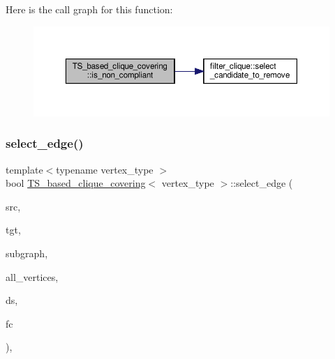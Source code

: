 Here is the call graph for this function\+:
\nopagebreak
\begin{figure}[H]
\begin{center}
\leavevmode
\includegraphics[width=350pt]{d1/d29/classTS__based__clique__covering_a5a3e99dae13279b217976fba856fb30d_cgraph}
\end{center}
\end{figure}
\mbox{\label{classTS__based__clique__covering_a5a637fe39f725d7486e89fb3f773476f}} 
\subsubsection{\texorpdfstring{select\+\_\+edge()}{select\_edge()}}
{\footnotesize\ttfamily template$<$typename vertex\+\_\+type $>$ \\
bool \hyperlink{classTS__based__clique__covering}{T\+S\+\_\+based\+\_\+clique\+\_\+covering}$<$ vertex\+\_\+type $>$\+::select\+\_\+edge (\begin{DoxyParamCaption}\item[{\hyperlink{clique__covering__graph_8hpp_a9cb45047ea8c5ed95a8cfa90494345aa}{C\+\_\+vertex} \&}]{src,  }\item[{\hyperlink{clique__covering__graph_8hpp_a9cb45047ea8c5ed95a8cfa90494345aa}{C\+\_\+vertex} \&}]{tgt,  }\item[{const \hyperlink{clique__covering__graph_8hpp_aa88e9419fe776ef37020cacd507cc4ad}{cc\+\_\+compatibility\+\_\+graph} \&}]{subgraph,  }\item[{const \hyperlink{classCustomUnorderedSet}{Custom\+Unordered\+Set}$<$ \hyperlink{clique__covering__graph_8hpp_a9cb45047ea8c5ed95a8cfa90494345aa}{C\+\_\+vertex} $>$ \&}]{all\+\_\+vertices,  }\item[{typename boost\+::disjoint\+\_\+sets$<$ \hyperlink{clique__covering__graph_8hpp_af170aff46b9e4328f1ad9b119cf78b4a}{rank\+\_\+pmap\+\_\+type}, \hyperlink{clique__covering__graph_8hpp_af4c454ac367cfb12e29c98e6bc942a06}{pred\+\_\+pmap\+\_\+type} $>$ \&}]{ds,  }\item[{const \hyperlink{structfilter__clique}{filter\+\_\+clique}$<$ vertex\+\_\+type $>$ \&}]{fc }\end{DoxyParamCaption})\hspace{0.3cm}{\ttfamily [inline]}, {\ttfamily [private]}}




